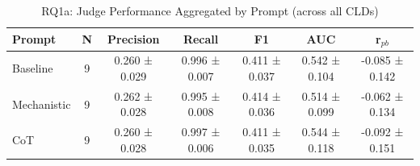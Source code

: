 \begin{table}[htbp]
\centreing
\caption{RQ1a: Judge Performance Aggregated by Prompt (across all CLDs)}
\label{tab:rq1a_by_prompt}
\begin{tabular}{lcccccc}
\toprule
\textbf{Prompt} & \textbf{N} & \textbf{Precision} & \textbf{Recall} & \textbf{F1} & \textbf{AUC} & \textbf{r$_{pb}$} \\
\midrule
Baseline & 9 & 0.260 ± 0.029 & 0.996 ± 0.007 & 0.411 ± 0.037 & 0.542 ± 0.104 & -0.085 ± 0.142 \\
Mechanistic & 9 & 0.262 ± 0.028 & 0.995 ± 0.008 & 0.414 ± 0.036 & 0.514 ± 0.099 & -0.062 ± 0.134 \\
CoT & 9 & 0.260 ± 0.028 & 0.997 ± 0.006 & 0.411 ± 0.035 & 0.544 ± 0.118 & -0.092 ± 0.151 \\
\bottomrule
\end{tabular}
\end{table}